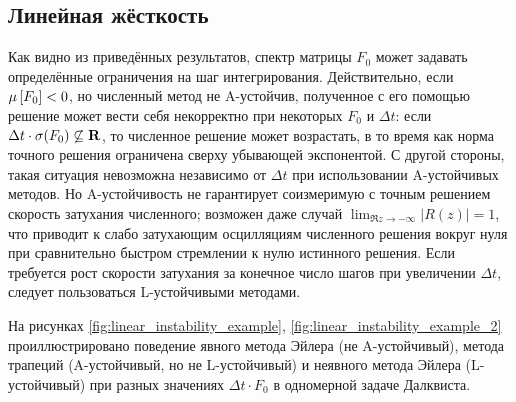 \subsection{Линейная жёсткость}
\label{subsec:linear_stiffness}

Как видно из приведённых результатов, спектр матрицы $ F_0 $ может задавать определённые ограничения на шаг интегрирования.
Действительно, если $ \mu \left[ F_0 \right] < 0 $, но численный метод не A-устойчив, полученное с его помощью решение может вести себя некорректно при некоторых $ F_0 $ и $ \Delta t $:
если $ \Delta t \cdot \sigma(F_0) \not\subseteq \mathbf{R} $, то численное решение может возрастать,
в то время как норма точного решения ограничена сверху убывающей экспонентой.
С другой стороны, такая ситуация невозможна независимо от $ \Delta t $ при использовании A-устойчивых методов.
Но A-устойчивость не гарантирует соизмеримую с точным решением скорость затухания численного; возможен даже случай $ \displaystyle \lim_{\Re z \to -\infty} |R(z)| = 1 $,
что приводит к слабо затухающим осцилляциям численного решения вокруг нуля при сравнительно быстром стремлении к нулю истинного решения.
Если требуется рост скорости затухания за конечное число шагов при увеличении $ \Delta t $, следует пользоваться L-устойчивыми методами.

На рисунках \ref{fig:linear_instability_example}, \ref{fig:linear_instability_example_2} проиллюстрировано поведение явного метода Эйлера (не A-ус\-той\-чи\-вый),
метода трапеций (A-устойчивый, но не L-устойчивый) и неявного метода Эйлера (L-устойчивый) при разных значениях $ \Delta t \cdot F_0 $ в одномерной задаче Далквиста.

